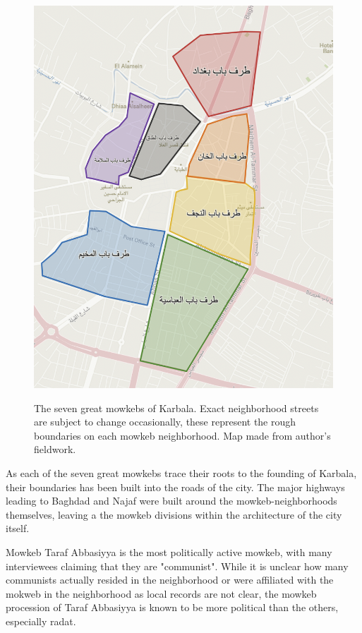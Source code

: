 \begin{figure}[]
\caption{The seven great mowkebs of Karbala. Exact neighborhood streets are subject to change occasionally, these represent the rough boundaries on each mowkeb neighborhood. Map made from author's fieldwork.}
\centering
\includegraphics[width=\textwidth]{images/seven-mowkebs.png}
\label{fig:mowkebs}
\end{figure}

As each of the seven great mowkebs trace their roots to the founding of Karbala, their boundaries has been built into the roads of the city. The major highways leading to Baghdad and Najaf were built around the mowkeb-neighborhoods themselves, leaving a the mowkeb divisions within the architecture of the city itself. 

Mowkeb Taraf Abbasiyya is the most politically active mowkeb, with many interviewees claiming that they are "communist". While it is unclear how many communists actually resided in the neighborhood or were affiliated with the mokweb in the neighborhood as local records are not clear, the mowkeb procession of Taraf Abbasiyya is known to be more political than the others, especially radat. 

